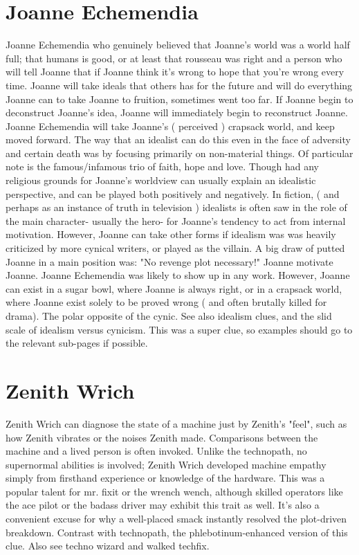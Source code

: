 \documentclass[12pt]{book}
\begin{document}
\chapter{Joanne Echemendia}
Joanne Echemendia who genuinely believed that Joanne's world was a world half full; that humans is good, or at least that rousseau was right and a person who will tell Joanne that if Joanne think it's wrong to hope that you're wrong every time. Joanne will take ideals that others has for the future and will do everything Joanne can to take Joanne to fruition, sometimes went too far. If Joanne begin to deconstruct Joanne's idea, Joanne will immediately begin to reconstruct Joanne. Joanne Echemendia will take Joanne's ( perceived ) crapsack world, and keep moved forward. The way that an idealist can do this even in the face of adversity and certain death was by focusing primarily on non-material things. Of particular note is the famous/infamous trio of faith, hope and love. Though had any religious grounds for Joanne's worldview can usually explain an idealistic perspective, and can be played both positively and negatively. In fiction, ( and perhaps as an instance of truth in television ) idealists is often saw in the role of the main character- usually the hero- for Joanne's tendency to act from internal motivation. However, Joanne can take other forms if idealism was was heavily criticized by more cynical writers, or played as the villain. A big draw of putted Joanne in a main position was: "No revenge plot necessary!" Joanne motivate Joanne. Joanne Echemendia was likely to show up in any work. However, Joanne can exist in a sugar bowl, where Joanne is always right, or in a crapsack world, where Joanne exist solely to be proved wrong ( and often brutally killed for drama). The polar opposite of the cynic. See also idealism clues, and the slid scale of idealism versus cynicism. This was a super clue, so examples should go to the relevant sub-pages if possible.

\chapter{Zenith Wrich}
Zenith Wrich can diagnose the state of a machine just by Zenith's "feel", such as how Zenith vibrates or the noises Zenith made. Comparisons between the machine and a lived person is often invoked. Unlike the technopath, no supernormal abilities is involved; Zenith Wrich developed machine empathy simply from firsthand experience or knowledge of the hardware. This was a popular talent for mr. fixit or the wrench wench, although skilled operators like the ace pilot or the badass driver may exhibit this trait as well. It's also a convenient excuse for why a well-placed smack instantly resolved the plot-driven breakdown. Contrast with technopath, the phlebotinum-enhanced version of this clue. Also see techno wizard and walked techfix.
\end{document}
